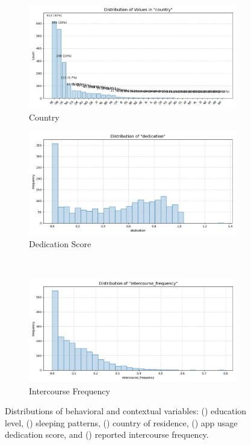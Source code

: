 \documentclass[11pt]{article}
\begin{document}
\begin{figure}[h]
  \vspace{0.5em}
  \begin{subfigure}{0.45\textwidth}
    \includegraphics[width=\linewidth]{plots/country.jpg}
    \caption{Country}
    \label{fig:dist_country}
  \end{subfigure}
  \hfill
  \begin{subfigure}{0.45\textwidth}
    \includegraphics[width=\linewidth]{plots/dedication.jpg}
    \caption{Dedication Score}
    \label{fig:dist_dedication}
  \end{subfigure}
  \\
  \vspace{0.5em}
  \begin{subfigure}{0.45\textwidth}
    \includegraphics[width=\linewidth]{plots/intercourse_frequency.jpg}
    \caption{Intercourse Frequency}
    \label{fig:dist_intercourse}
  \end{subfigure}
  \caption{
    Distributions of behavioral and contextual variables: 
    () education level, 
    () sleeping patterns, 
    () country of residence, 
    () app usage dedication score, and 
    () reported intercourse frequency.
  }
\end{figure}
\end{document}
